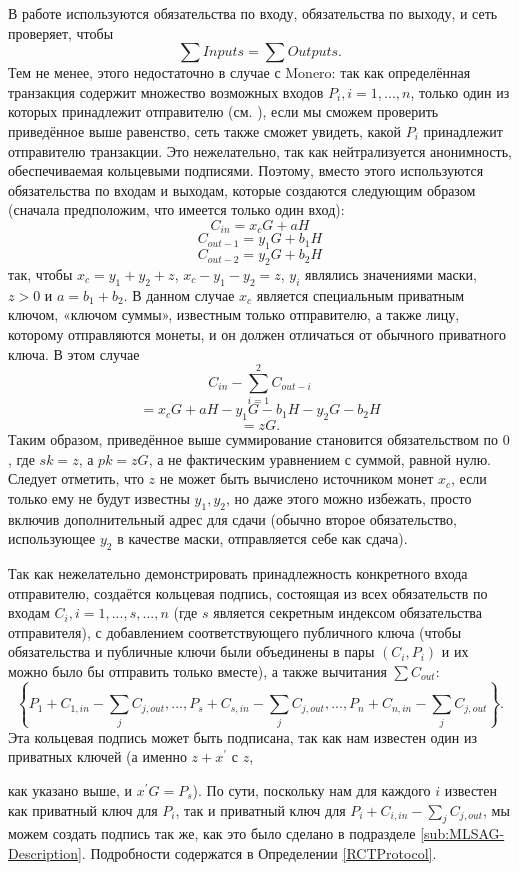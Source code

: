 \documentclass{mrl}
\theoremstyle{definition}
\numberwithin{thm}{section}
\begin{document}
В работе \cite{GM} используются обязательства по входу, обязательства по выходу, и сеть проверяет, чтобы
\[
\sum Inputs=\sum Outputs.
\]
Тем не менее, этого недостаточно в случае с Monero: так как определённая транзакция содержит множество возможных входов $P_{i},i=1,...,n$, только один из которых принадлежит отправителю (см. \cite[4.4]{CN}), если мы сможем проверить приведённое выше равенство, сеть также сможет увидеть, какой $P_{i}$ принадлежит отправителю транзакции. Это нежелательно, так как нейтрализуется анонимность, обеспечиваемая кольцевыми подписями. Поэтому, вместо этого используются обязательства по входам и выходам, которые создаются следующим образом (сначала предположим, что имеется только один вход):
\[
C_{in}=x_{c}G+aH
\]
\[
C_{out-1}=y_{1}G+b_{1}H
\]
\[
C_{out-2}=y_{2}G+b_{2}H
\]
так, чтобы $x_{c}=y_{1}+y_{2}+z$, $x_{c}-y_{1}-y_{2}=z$, $y_{i}$ являлись значениями маски, $z>0$ и $a=b_{1}+b_{2}.$ В данном случае $x_{c}$ является специальным приватным ключом, «ключом суммы», известным только отправителю, а также лицу, которому отправляются монеты, и он должен отличаться от обычного приватного ключа. В этом случае
\[
C_{in}-\sum_{i=1}^{2}C_{out-i}
\]
\[
=x_{c}G+aH-y_{1}G-b_{1}H-y_{2}G-b_{2}H
\]
\[
=zG.
\]
Таким образом, приведённое выше суммирование становится обязательством по $0$, где $sk=z$, а $pk=zG$, а не фактическим уравнением с суммой, равной нулю. Следует отметить, что $z$ не может быть вычислено источником монет $x_{c}$, если только ему не будут известны $y_{1},y_{2}$, но даже этого можно избежать, просто включив дополнительный адрес для сдачи (обычно второе обязательство, использующее $y_2$ в качестве маски, отправляется себе как сдача).

Так как нежелательно демонстрировать принадлежность конкретного входа отправителю, создаётся кольцевая подпись, состоящая из всех обязательств по входам $C_{i},i=1,...,s,...,n$ (где $s$ является секретным индексом обязательства отправителя), с добавлением соответствующего публичного ключа (чтобы обязательства и публичные ключи были объединены в пары $\left(C_{i},P_{i}\right)$ и их можно было бы отправить только вместе), а также вычитания $\sum C_{out}$:
\[
\left\{ P_{1}+C_{1,in}-\sum_{j}C_{j,out},...,P_{s}+C_{s,in}-\sum_{j}C_{j,out},...,P_{n}+C_{n,in}-\sum_{j}C_{j,out}\right\} .
\]
Эта кольцевая подпись может быть подписана, так как нам известен один из приватных ключей (а именно $z+x^{\prime}$ с $z$, %
\begin{comment}
note you can't use $x_{s}=s$, or else once the output amount is unvelied,
the ring sig is caput - check this, since there are masks...
\end{comment}
как указано выше, и $x^{\prime}G=P_{s}$). По сути, поскольку нам для каждого $i$ известен как приватный ключ для $P_{i}$, так и приватный ключ для $P_{i}+C_{i,in}-\sum_{j}C_{j,out}$, мы можем создать подпись так же, как это было сделано в подразделе \ref{sub:MLSAG-Description}. Подробности содержатся в Определении \ref{RCTProtocol}.
\end{document}
